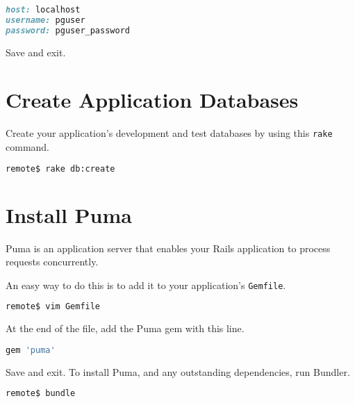 \begin{minipage}{\linewidth}
  \begin{lstlisting}[language=ruby, caption={config/database.yml}]
host: localhost
username: pguser
password: pguser_password
\end{lstlisting}
\end{minipage}

Save and exit.

\section{Create Application Databases}

Create your application's development and test databases by using this \texttt{rake} command.

\begin{minipage}{\linewidth}
\begin{lstlisting}[language=bash]
remote$ rake db:create
\end{lstlisting}
\end{minipage}

\section{Install Puma}

Puma is an application server that enables your Rails application
to process requests concurrently.

An easy way to do this is to add it to your application's \texttt{Gemfile}.

\begin{minipage}{\linewidth}
\begin{lstlisting}[language=bash]
remote$ vim Gemfile
\end{lstlisting}
\end{minipage}

At the end of the file, add the Puma gem with this line.

\begin{minipage}{\linewidth}
  \begin{lstlisting}[language=ruby, caption={Gemfile}]
gem 'puma'
\end{lstlisting}
\end{minipage}

Save and exit. To install Puma, and any outstanding dependencies, run Bundler.

\begin{minipage}{\linewidth}
\begin{lstlisting}[language=bash]
remote$ bundle
\end{lstlisting}
\end{minipage}

